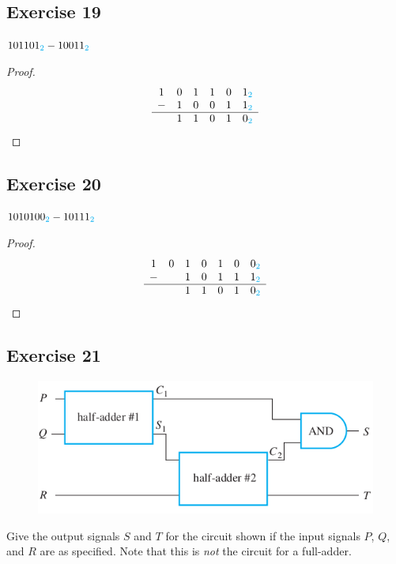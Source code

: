 \documentclass[14pt]{extarticle}
\newcommand{\base}[1]{{\color{cyan}#1}}
\begin{document}
\subsection{Exercise 19} 
$101101_\base{2} - 10011_\base{2}$

\begin{proof} 
$$ 
\begin{array}{cccccc} 
1&0&1&1&0&1_\base{2}\\
-&1&0&0&1&1_\base{2}\\ 
\hline 
&1&1&0&1&0_\base{2}\\ 
\end{array} 
$$ 
\end{proof}

\subsection{Exercise 20} 
$1010100_\base{2} - 10111_\base{2}$

\begin{proof} 
$$ 
\begin{array}{ccccccc} 
1&0&1&0&1&0&0_\base{2}\\ 
-&&1&0&1&1&1_\base{2}\\ 
\hline 
& &1&1&0&1&0_\base{2}\\ 
\end{array} 
$$ 
\end{proof}

\subsection{Exercise 21} 
\begin{figure}[ht!] 
\centering
\includegraphics[scale=0.4]{../images/2.5.21.png} 
\end{figure}

Give the output signals $S$ and $T$ for the circuit shown if the input signals $P$, $Q$, and $R$ are as specified. Note that this is {\it not} the circuit for a full-adder.
\end{document}
